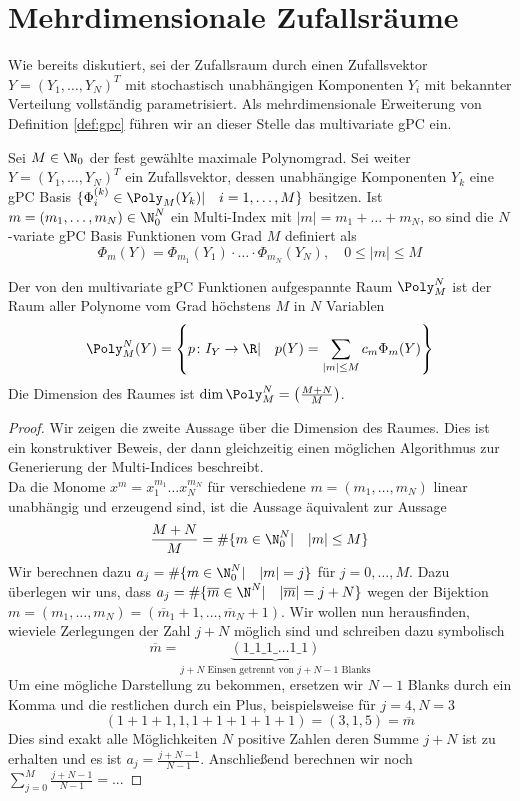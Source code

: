 \section{Mehrdimensionale Zufallsräume}
Wie bereits diskutiert, sei der Zufallsraum durch einen Zufallsvektor $Y=(Y_1,\dots,Y_N)^T$ mit stochastisch unabhängigen Komponenten $Y_i$ mit bekannter Verteilung vollständig parametrisiert. Als mehrdimensionale Erweiterung von Definition \ref{def:gpc} führen wir an dieser Stelle das multivariate gPC ein.
\begin{mathdef}
Sei $M\in\N_0$ der fest gewählte maximale Polynomgrad. Sei weiter $Y=(Y_1,\dots,Y_N)^T$ ein Zufallsvektor, dessen unabhängige Komponenten $Y_k$ eine gPC Basis $\lbrace \Phi_i^{(k)}\in\Poly_M(Y_k)|\quad i=1,\dots,M\rbrace$ besitzen. Ist $m=(m_1,\dots,m_N)\in\N_0^N$ ein Multi-Index mit $|m|=m_1+\dots+m_N$, so sind die $N$-variate gPC Basis Funktionen vom Grad $M$ definiert als 
\[\Phi_m(Y)=\Phi_{m_1}(Y_1)\cdot\ldots\cdot\Phi_{m_N}(Y_N),\quad 0\le |m|\le M\]
\end{mathdef}

\begin{mathbem}
Der von den multivariate gPC Funktionen aufgespannte Raum $\Poly_M^N$ ist der Raum aller Polynome vom Grad höchstens $M$ in $N$ Variablen
\[\Poly_M^N(Y)=\left\lbrace p\colon I_Y\to \R |\quad p(Y)=\sum_{|m|\le M}c_m\Phi_m(Y)\right\rbrace\]
Die Dimension des Raumes ist $\dim\Poly_M^N=\left(\frac{M+N}{M}\right)$.
\end{mathbem}
\begin{proof}
Wir zeigen die zweite Aussage über die Dimension des Raumes. Dies ist ein konstruktiver Beweis, der dann gleichzeitig einen möglichen Algorithmus zur Generierung der Multi-Indices beschreibt.\\
Da die Monome $x^m=x_1^{m_1}\dots x_N^{m_N}$ für verschiedene $m=(m_1,\dots,m_N)$ linear unabhängig und erzeugend sind, ist die Aussage äquivalent zur Aussage
\[\frac{M+N}{M}=\#\lbrace m\in\N_0^N |\quad |m|\le M\rbrace\] 
Wir berechnen dazu $a_j=\#\lbrace m\in\N_0^N |\quad |m|=j\rbrace$ für $j=0,\dots,M$. Dazu überlegen wir uns, dass $a_j=\#\lbrace \overline{m}\in\N^N |\quad |\overline{m}|=j+N\rbrace$ wegen der Bijektion $m=(m_1,\dots,m_N)=(\overline{m}_1+1,\dots,\overline{m}_N+1)$. Wir wollen nun herausfinden, wieviele Zerlegungen der Zahl $j+N$ möglich sind und schreiben dazu symbolisch
\[\overline{m}=\underbrace{(1\_1\_1\_\dots 1\_1)}_{j+N\text{ Einsen getrennt von } j+N-1 \text{ Blanks}}\]
Um eine mögliche Darstellung zu bekommen, ersetzen wir $N-1$ Blanks durch ein Komma und die restlichen durch ein Plus, beispielsweise für $j=4,N=3$
\[(1+1+1,1,1+1+1+1+1)=(3,1,5)=\overline{m}\]
Dies sind exakt alle Möglichkeiten $N$ positive Zahlen deren Summe $j+N$ ist zu erhalten und es ist $a_j=\frac{j+N-1}{N-1}$.
Anschließend berechnen wir noch $\sum_{j=0}^M\frac{j+N-1}{N-1}=...$
\end{proof}
